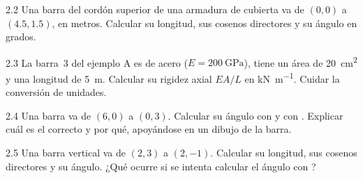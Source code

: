 \begin{ejercicio}{2.2}
Una barra del cordón superior de una armadura de cubierta va de $(0, 0)$ a
$(4.5, 1.5)$, en metros. Calcular su longitud, sus cosenos directores y su
ángulo en grados.
\end{ejercicio}

\begin{ejercicio}{2.3}
La barra~3 del ejemplo A es de acero ($E = \SI{200}{\giga\pascal}$), tiene
un área de \SI{20}{\centi\metre\squared} y una longitud de \SI{5}{\metre}.
Calcular su rigidez axial $EA/L$ en \si{\kilo\newton\per\metre}. Cuidar la
conversión de unidades.
\end{ejercicio}

\begin{ejercicio}{2.4}
Una barra va de $(6, 0)$ a $(0, 3)$. Calcular su ángulo con
 y con . Explicar cuál es el
correcto y por qué, apoyándose en un dibujo de la barra.
\end{ejercicio}

\begin{ejercicio}{2.5}
Una barra vertical va de $(2, 3)$ a $(2, -1)$. Calcular su longitud, sus
cosenos directores y su ángulo. ¿Qué ocurre si se intenta calcular el ángulo
con ?
\end{ejercicio}

